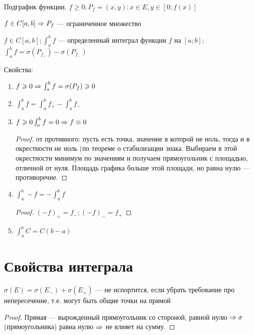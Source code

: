 \begin{Def}
	Подграфик функции. $ f \geqslant 0; P_f = {(x, y): x \in E, y \in [0; f(x)]} $
\end{Def}

\begin{Rem}
	$f \in C[a, b] \Rightarrow P_f $ --- ограниченное множество
\end{Rem}

\begin{Def}
	$f \in C[a, b]; \int_a^b f$ --- определенный интеграл функции $ f$ на $[a; b]$; $\int_a^b f = \sigma (P_{f_+}) - \sigma (P_{f_-}) $
\end{Def}
Свойства:
\begin{enumerate}
\item 
	$f \geqslant 0 \Rightarrow \int_a^b f = \sigma(P_f) \geqslant 0$
	
\item 
	$\int_a^b f  = \int_a^b f_+ - \int_a^b f_- $

\item 
	$f \geqslant 0 \int_a^b f = 0 \Rightarrow f \equiv 0$
	\begin{proof}
		от противного: пусть есть точка, значение в которой не ноль, тогда и в окрестности не ноль (по теореме о стабилизации знака.
		Выбираем в этой окрестности минимум по значениям и получаем прямоугольник с площадью, отличной от нуля.
		Площадь графика больше этой площади, но равна нулю --- противоречие.
	\end{proof} 

\item 
	$\int_a^b -f = - \int_a^b f$
	\begin{proof}
		$(-f)_+ = f_- ; (-f)_- = f_+ $
	\end{proof} 

\item 
	$\int_a^b C = C(b - a)$

\end{enumerate}

\section{Свойства интеграла}

\begin{Rem}
	$ \sigma (E) = \sigma (E_-) + \sigma (E_+) $ --- не испортится, если убрать требование про непересечение, т.е. могут быть общие точки на прямой
\end{Rem}
\begin{proof}
	Прямая --- вырожденный прямоугольник со стороной, равной нулю $ \Rightarrow \sigma $ (прямоугольника) равна нулю $ \Rightarrow $ не влияет на сумму.
\end{proof}

